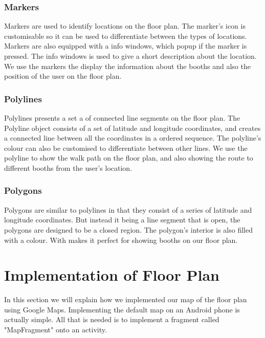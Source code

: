 \subsubsection*{Markers}
Markers are used to identify locations on the floor plan. The marker's icon is customisable so it can be used to differentiate between the types of locations. Markers are also equipped with a info windows, which popup if the marker is pressed. The info windows is used to give a short description about the location. We use the markers the display the information about the booths and also the position of the user on the floor plan.
\subsubsection*{Polylines}
Polylines presents a set a of connected line segments on the floor plan. The Polyline object consists of a set of latitude and longitude coordinates, and creates a connected line between all the coordinates in a ordered sequence. The polyline's colour can also be customised to differentiate between other lines. We use the polyline to show the walk path on the floor plan, and also showing the route to different booths from the user's location.

\subsubsection*{Polygons}
Polygons are similar to polylines in that they consist of a series of latitude and longitude coordinates. But instead it being a line segment that is open, the polygons are designed to be a closed region. The polygon's interior is also filled with a colour. With makes it perfect for showing booths on our floor plan.

\section{Implementation of Floor Plan}
In this section we will explain how we implemented our map of the floor plan using  Google Maps. Implementing the default map on an Android phone is actually simple. All that is needed is to implement a fragment called "MapFragment" onto an activity.
